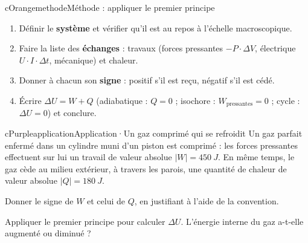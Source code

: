 \begin{encart}{cOrange}{methode}{Méthode : appliquer le premier principe}
\begin{enumerate}[label={\sffamily\bfseries\color{cOrange}\arabic*.}, leftmargin=5mm, itemsep=0pt, topsep=1pt]
  \item Définir le \textbf{système} et vérifier qu’il est au repos à l’échelle macroscopique.
  \item Faire la liste des \textbf{échanges} : travaux (forces pressantes $-P\cdot\Delta V$, électrique $U\cdot I\cdot\Delta t$, mécanique) et chaleur.
  \item Donner à chacun son \textbf{signe} : positif s’il est reçu, négatif s’il est cédé.
  \item Écrire $\Delta U = W + Q$ (adiabatique : $Q = 0$ ; isochore : $W_{\text{pressantes}} = 0$ ; cycle : $\Delta U = 0$) et conclure.
\end{enumerate}
\end{encart}

\begin{rub}[unbreakable]{cPurple}{application}{Application\enspace·\enspace Un gaz comprimé qui se refroidit}
Un gaz parfait enfermé dans un cylindre muni d’un piston est comprimé : les forces pressantes effectuent sur lui un travail de valeur absolue $|W| = \qty{450}{J}$. En même temps, le gaz cède au milieu extérieur, à travers les parois, une quantité de chaleur de valeur absolue $|Q| = \qty{180}{J}$.
\begin{appq}
  \item Donner le signe de $W$ et celui de $Q$, en justifiant à l’aide de la convention.
  \item Appliquer le premier principe pour calculer $\Delta U$. L’énergie interne du gaz a-t-elle augmenté ou diminué ?
\end{appq}
\end{rub}

